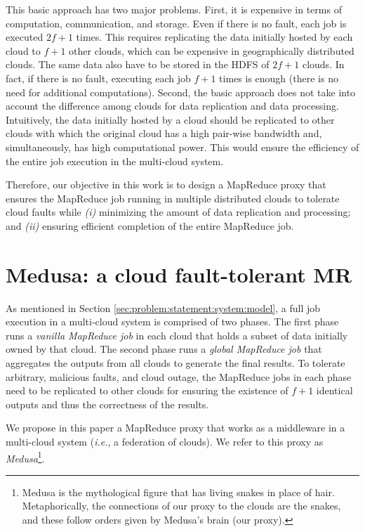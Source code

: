 \documentclass[10pt, conference, compsocconf]{IEEEtran}
\begin{document}
This basic approach has two major problems. First, it is expensive in terms of computation, communication, and storage. Even if there is no fault, each job is executed $2f+1$ times. This requires replicating the data initially hosted by each cloud to $f+1$ other clouds, which can be expensive in geographically distributed clouds. The same data also have to be stored in the HDFS of $2f+1$ clouds. In fact, if there is no fault, executing each job $f+1$ times is enough (there is no need for additional computations). Second, the basic approach does not take into account the difference among clouds for data replication and data processing. Intuitively, the data initially hosted by a cloud should be replicated to other clouds with which the original cloud has a high pair-wise bandwidth and, simultaneously, has high computational power. This would ensure the efficiency of the entire job execution in the multi-cloud system.

Therefore, our objective in this work is to design a MapReduce proxy that ensures the MapReduce job running in multiple distributed clouds to tolerate cloud faults while \textit{(i)} minimizing the amount of data replication and processing; and \textit{(ii)} ensuring efficient completion of the entire MapReduce job.

\section{Medusa: a cloud fault-tolerant MR}
\label{sec:solution:definition}

As mentioned in Section \ref{sec:problem:statement:system:model}, a full job execution in a multi-cloud system is comprised of two phases. The first phase runs a \emph{vanilla MapReduce job} in each cloud that holds a subset of data initially owned by that cloud. The second phase runs a \emph{global MapReduce job} that aggregates the outputs from all clouds to generate the final results. To tolerate arbitrary, malicious faults, and cloud outage, the MapReduce jobs in each phase need to be replicated to other clouds for ensuring the existence of $f+1$ identical outputs and thus the correctness of the results.

We propose in this paper a MapReduce proxy that works as a middleware in a multi-cloud system (\textit{i.e.}, a federation of clouds).
We refer to this proxy as \textit{Medusa}\footnote{Medusa is the mythological figure that has living snakes in place of hair. Metaphorically, the connections of our proxy to the clouds are the snakes, and these follow orders given by Medusa's brain (our proxy).}.
\end{document}
